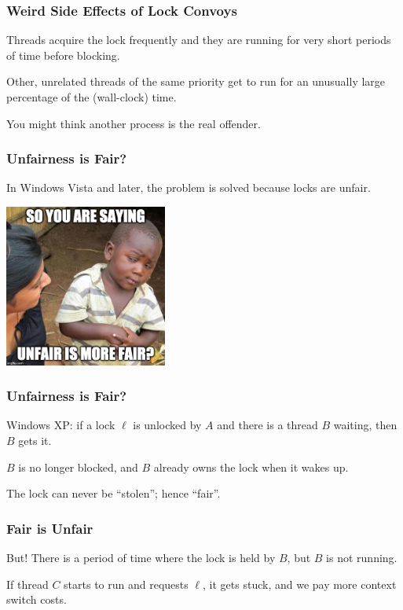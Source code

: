 \begin{frame}
\frametitle{Weird Side Effects of Lock Convoys}

Threads acquire the lock frequently and they are running for very short periods of time before blocking. 

Other, unrelated threads of the same priority get to run for an unusually large percentage of the (wall-clock) time. 

You might think another process is the real offender.

\end{frame}

\begin{frame}
\frametitle{Unfairness is Fair?}

In Windows Vista and later, the problem is solved because locks are unfair.

\begin{center}
	\includegraphics[width=0.4\textwidth]{images/skepticalkid.jpg}
\end{center}

\end{frame}

\begin{frame}
\frametitle{Unfairness is Fair?}

Windows XP: if a lock $\ell$ is unlocked by $A$ and there is a thread $B$ waiting, then $B$ gets it.

$B$ is no longer blocked, and $B$ already owns the lock when it wakes up.

The lock can never be ``stolen''; hence ``fair''.

\end{frame}

\begin{frame}
\frametitle{Fair is Unfair}


But! There is a period of time where the lock is held by $B$, but $B$ is not running.

If thread $C$ starts to run and requests $\ell$, it gets stuck, and we pay more context switch costs.


\end{frame}

